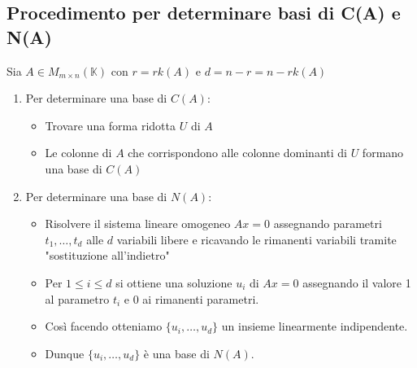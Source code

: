 \documentclass[a4paper]{article}
\theoremstyle{break}
\theoremstyle{break}
\theoremstyle{break}
\theoremstyle{break}
\begin{document}
\subsection{Procedimento per determinare basi di C(A) e N(A)}
\label{8.5}
Sia \( A \in M_{m \times n}(\mathbb{K}) \) con \( r = rk(A) \) e \( d = n-r = n - rk(A) \) 
\begin{enumerate}
  \item Per determinare una base di \( C(A) \):
    \begin{itemize}
      \item Trovare una forma ridotta \( U \) di \( A \)
      \item Le colonne di \( A \) che corrispondono alle colonne dominanti di \( U \) 
        formano una base di \( C(A) \)
    \end{itemize}

  \item Per determinare una base di \( N(A) \):
    \begin{itemize}
      \item Risolvere il sistema lineare omogeneo \( Ax = 0 \) assegnando parametri
        \( t_1, \ldots, t_d \) alle \( d \) variabili libere e ricavando le rimanenti
        variabili tramite "sostituzione all'indietro"
      \item Per \( 1 \le  i \le d \) si ottiene una soluzione \( u_i \) di \( Ax=0 \) 
        assegnando il valore 1 al parametro \( t_i \) e 0 ai rimanenti parametri.
      \item Così facendo otteniamo \( \{u_i, \ldots, u_d\}  \) un insieme linearmente
        indipendente.
      \item Dunque \( \{u_i, \ldots, u_d\}  \) è una base di \( N(A) \).
    \end{itemize}
\end{enumerate}
\end{document}
